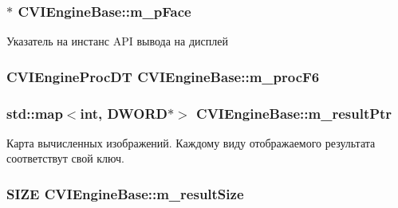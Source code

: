 \hypertarget{class_c_v_i_engine_base_a67ce30a4c5018bdb7d33725094454166}{
\subsubsection[{m\+\_\+p\+Face}]{$\ast$ C\+V\+I\+Engine\+Base\+::m\+\_\+p\+Face}}\label{class_c_v_i_engine_base_a67ce30a4c5018bdb7d33725094454166}


Указатель на инстанс A\+P\+I вывода на дисплей 

\hypertarget{class_c_v_i_engine_base_af130df6a0fc2f75aeea417af333755a2}{
\subsubsection[{m\+\_\+proc\+F6}]{\setlength{\rightskip}{0pt plus 5cm}C\+V\+I\+Engine\+Proc\+D\+T C\+V\+I\+Engine\+Base\+::m\+\_\+proc\+F6}}\label{class_c_v_i_engine_base_af130df6a0fc2f75aeea417af333755a2}




\hypertarget{class_c_v_i_engine_base_a34c8596778c068f60030853df3589147}{
\subsubsection[{m\+\_\+result\+Ptr}]{\setlength{\rightskip}{0pt plus 5cm}std\+::map$<$int, D\+W\+O\+R\+D$\ast$$>$ C\+V\+I\+Engine\+Base\+::m\+\_\+result\+Ptr}}\label{class_c_v_i_engine_base_a34c8596778c068f60030853df3589147}


Карта вычисленных изображений. Каждому виду отображаемого результата соответствут свой ключ. 

\hypertarget{class_c_v_i_engine_base_aec00e6d3113182f3193b3b4345c4e433}{
\subsubsection[{m\+\_\+result\+Size}]{\setlength{\rightskip}{0pt plus 5cm}S\+I\+Z\+E C\+V\+I\+Engine\+Base\+::m\+\_\+result\+Size}}\label{class_c_v_i_engine_base_aec00e6d3113182f3193b3b4345c4e433}


